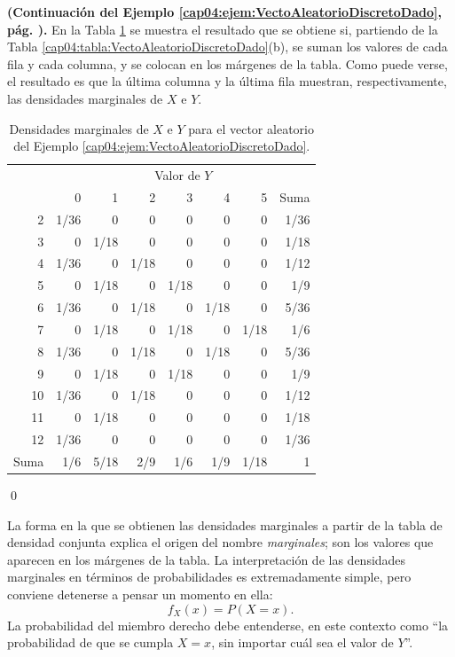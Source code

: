 \begin{ejemplo}
\label{cap04:ejem:densidadesMarginales}
{\bf (Continuación del Ejemplo \ref{cap04:ejem:VectoAleatorioDiscretoDado}, pág. \pageref{cap04:ejem:VectoAleatorioDiscretoDado}).} En la Tabla \ref{cap04:tabla:MarginalesVectoAleatorioDiscretoDado} se muestra el resultado que se obtiene si, partiendo de la Tabla \ref{cap04:tabla:VectoAleatorioDiscretoDado}(b), se suman los valores de cada fila y cada columna, y se colocan en los márgenes de la tabla. Como puede verse, el resultado es que la última columna y la última fila muestran, respectivamente, las densidades marginales de $X$ e $Y$.
\begin{table}[ht]
\begin{center}
{
}
\quad
\begin{tabular}{|r|r|r|r|r|r|r|r|}
  \multicolumn{1}{c}{}&\multicolumn{7}{c}{Valor de $Y$}\\
  \cline{2-8}
  \multicolumn{1}{c|}{}& 0 & 1 & 2 & 3 & 4 & 5 & Suma \\
  \hline
  2 & 1/36 & 0 & 0 & 0 & 0 & 0 & 1/36 \\ \hline
  3 & 0 & 1/18 & 0 & 0 & 0 & 0 & 1/18 \\ \hline
  4 & 1/36 & 0 & 1/18 & 0 & 0 & 0 & 1/12 \\ \hline
  5 & 0 & 1/18 & 0 & 1/18 & 0 & 0 & 1/9 \\ \hline
  6 & 1/36 & 0 & 1/18 & 0 & 1/18 & 0 & 5/36 \\ \hline
  7 & 0 & 1/18 & 0 & 1/18 & 0 & 1/18 & 1/6 \\ \hline
  8 & 1/36 & 0 & 1/18 & 0 & 1/18 & 0 & 5/36 \\ \hline
  9 & 0 & 1/18 & 0 & 1/18 & 0 & 0 & 1/9 \\ \hline
  10 & 1/36 & 0 & 1/18 & 0 & 0 & 0 & 1/12 \\ \hline
  11 & 0 & 1/18 & 0 & 0 & 0 & 0 & 1/18 \\ \hline
  12 & 1/36 & 0 & 0 & 0 & 0 & 0 & 1/36 \\ \hline
  Suma & 1/6 & 5/18 & 2/9 & 1/6 & 1/9 & 1/18 & 1 \\
   \hline
\end{tabular}
\end{center}
\caption{Densidades marginales de $X$ e $Y$ para el vector aleatorio del Ejemplo \ref{cap04:ejem:VectoAleatorioDiscretoDado}.}
\label{cap04:tabla:MarginalesVectoAleatorioDiscretoDado}
\end{table}
\qed
\end{ejemplo}
La forma en la que se obtienen las densidades marginales a partir de la tabla de densidad conjunta explica el origen del nombre {\em marginales}; son los valores que aparecen en los márgenes de la tabla. La interpretación de las densidades marginales en términos de probabilidades es extremadamente simple, pero conviene detenerse a pensar un momento en ella:
\begin{equation}
\label{cap04:ecu:DensidadMarginalXInterpretacionProababilistica}
f_X(x)=P(X=x).
\end{equation}
La probabilidad del miembro derecho debe entenderse, en este contexto como ``la probabilidad de que se cumpla $X=x$, sin importar cuál sea el valor de $Y$''.

